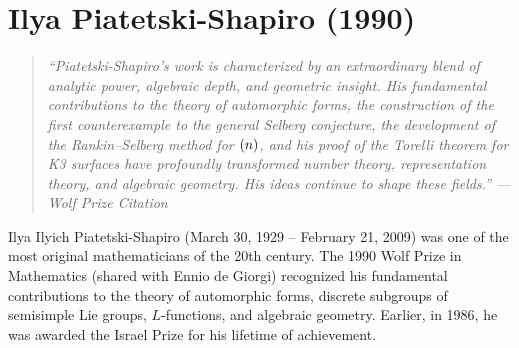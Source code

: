 \let\R\relax
\newcommand{\R}{\mathbb{R}}
\let\C\relax
\newcommand{\C}{\mathbb{C}}
\let\N\relax
\newcommand{\N}{\mathbb{N}}
\let\Z\relax
\newcommand{\Z}{\mathbb{Z}}
\let\Q\relax
\newcommand{\Q}{\mathbb{Q}}
\let\A\relax
\newcommand{\A}{\mathbb{A}}
\let\F\relax
\newcommand{\F}{\mathbb{F}}
\let\SO\relax
\newcommand{\SO}{\operatorname{SO}}
\let\SL\relax
\newcommand{\SL}{\operatorname{SL}}
\let\GL\relax
\newcommand{\GL}{\operatorname{GL}}
\let\Sp\relax
\newcommand{\Sp}{\operatorname{Sp}}
\let\St\relax
\newcommand{\St}{\operatorname{St}}
\let\GV\relax
\newcommand{\GV}{\operatorname{GV}}
\let\E\relax
\newcommand{\E}{\operatorname{E}}
\let\SU\relax
\newcommand{\SU}{\operatorname{SU}}
\let\Aut\relax
\newcommand{\Aut}{\operatorname{Aut}}
\let\Gal\relax
\newcommand{\Gal}{\operatorname{Gal}}
\let\Ad\relax
\newcommand{\Ad}{\operatorname{Ad}}
\let\Ind\relax
\newcommand{\Ind}{\operatorname{Ind}}
\let\Spec\relax
\newcommand{\Spec}{\operatorname{Spec}}
\let\Vol\relax
\newcommand{\Vol}{\operatorname{Vol}}
\let\Pic\relax
\newcommand{\Pic}{\operatorname{Pic}}
\let\Sym\relax
\newcommand{\Sym}{\operatorname{Sym}}
\let\End\relax
\newcommand{\End}{\operatorname{End}}
\let\Hom\relax
\newcommand{\Hom}{\operatorname{Hom}}
\let\Lie\relax
\newcommand{\Lie}{\operatorname{Lie}}
\let\ord\relax
\newcommand{\ord}{\operatorname{ord}}
\let\Cusp\relax
\newcommand{\Cusp}{\operatorname{Cusp}}
\let\Disc\relax
\newcommand{\Disc}{\operatorname{Disc}}
\let\sgn\relax
\newcommand{\sgn}{\operatorname{sgn}}
\let\supp\relax
\newcommand{\supp}{\operatorname{supp}}

\chapter{Ilya Piatetski-Shapiro (1990)}

\begin{quote}
\it ``Piatetski-Shapiro's work is characterized by an extraordinary blend of analytic power, algebraic depth, and geometric insight. His fundamental contributions to the theory of automorphic forms, the construction of the first counterexample to the general Selberg conjecture, the development of the Rankin--Selberg method for \(\GL(n)\), and his proof of the Torelli theorem for K3 surfaces have profoundly transformed number theory, representation theory, and algebraic geometry. His ideas continue to shape these fields.'' --- Wolf Prize Citation
\end{quote}

Ilya Ilyich Piatetski-Shapiro (March 30, 1929 -- February 21, 2009) was one of the most original mathematicians of the 20th century. The 1990 Wolf Prize in Mathematics (shared with Ennio de Giorgi) recognized his fundamental contributions to the theory of automorphic forms, discrete subgroups of semisimple Lie groups, \(L\)-functions, and algebraic geometry. Earlier, in 1986, he was awarded the Israel Prize for his lifetime of achievement.

